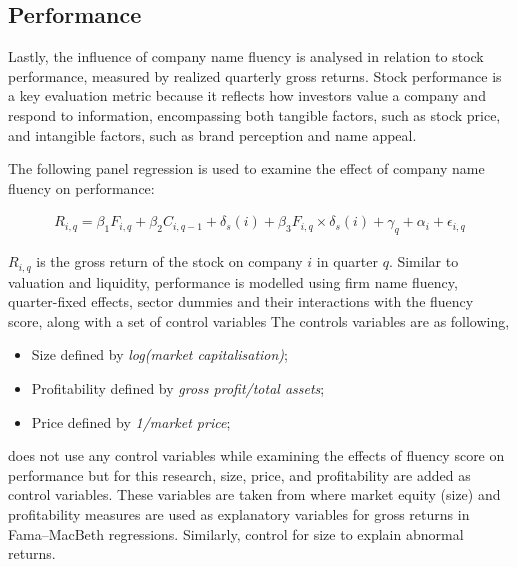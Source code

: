 \documentclass[a4paper,11pt]{report}
\begin{document}
\subsection{Performance}
Lastly, the influence of company name fluency is analysed in relation to stock performance, measured by realized quarterly gross returns. Stock performance is a key evaluation metric because it reflects how investors value a company and respond to information, encompassing both tangible factors, such as stock price, and intangible factors, such as brand perception and name appeal.

The following panel regression is used to examine the effect of company name fluency on performance: 

\begin{align}
    R_{i,q} = \beta_1F_{i,q} + {\beta_2}C_{i,q-1}+ \delta_s(i) + {\beta_3}F_{i,q} \times \delta_s(i) +\gamma_q + \alpha_i + \epsilon_{i,q}
\end{align}

$R_{i,q}$ is the gross return of the stock on company $i$ in quarter $q$. Similar to valuation and liquidity, performance is modelled using firm name fluency, quarter-fixed effects, sector dummies and their interactions with the fluency score, along with a set of control variables The controls variables are as following, 
\begin{itemize}
    \item Size defined by \textit{log(market capitalisation)};
    \item Profitability defined by \textit{gross profit/total assets};
    \item Price defined by \textit{1/market price};
\end{itemize}
 does not use any control variables while examining the effects of fluency score on performance but for this research, size, price, and profitability are added as control variables. These variables are taken from \cite{perform} where market equity (size) and  profitability measures are used as explanatory variables for gross returns in Fama–MacBeth regressions. Similarly,  control for size to explain abnormal returns.
\end{document}
